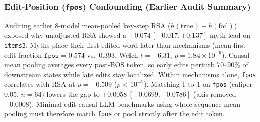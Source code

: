 \documentclass[conference]{IEEEtran}
\begin{document}
\subsubsection{Edit-Position (\texttt{fpos}) Confounding (Earlier Audit Summary)}
Auditing earlier 8-model mean-pooled key-step RSA ($h(\text{true})-h(\text{foil})$) exposed why unadjusted RSA showed a $+0.074\,[+0.017,+0.137]$ myth lead on \texttt{items3}. Myths place their first edited word later than mechanisms (mean first-edit fraction $\texttt{fpos}=0.574$ vs.\ $0.393$, Welch $t=+6.31$, $p=1.84\times10^{-9}$). Causal mean pooling averages every post-BOS token, so early edits perturb 70--90\% of downstream states while late edits stay localized. Within mechanisms alone, \texttt{fpos} correlates with RSA at $\rho=+0.509$ ($p<10^{-7}$). Matching 1-to-1 on \texttt{fpos} (caliper 0.05, $n=64$) lowers the gap to $+0.0058\,[-0.0699,+0.0786]$ (axis-removed $-0.0008$). Minimal-edit causal LLM benchmarks using whole-sequence mean pooling must therefore match \texttt{fpos} or pool strictly after the edit token.
\end{document}
